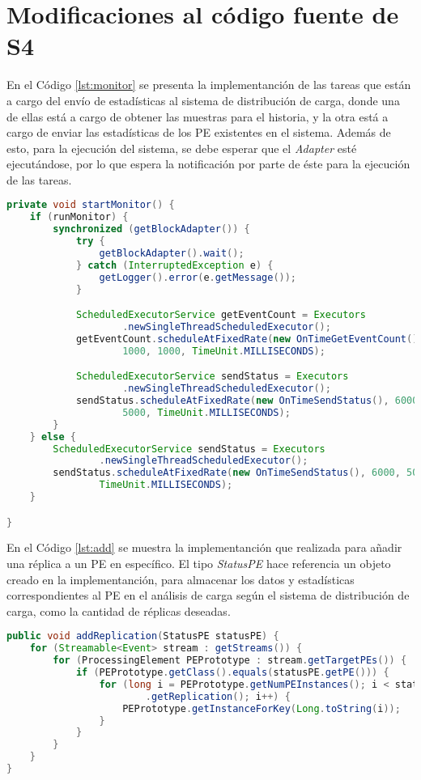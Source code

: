 \chapter{Modificaciones al c\'odigo fuente de S4}
\label{apendice:codigoFuenteS4}

En el C\'odigo \ref{lst:monitor} se presenta la implementanci\'on de las tareas que est\'an a cargo del env\'io de estad\'isticas al sistema de distribuci\'on de carga, donde una de ellas est\'a a cargo de obtener las muestras para el historia, y la otra est\'a a cargo de enviar las estad\'isticas de los PE existentes en el sistema. Adem\'as de esto, para la ejecuci\'on del sistema, se debe esperar que el \textit{Adapter} est\'e ejecut\'andose, por lo que espera la notificaci\'on por parte de \'este para la ejecuci\'on de las tareas.

\begin{lstlisting}[caption={Tareas que ejecutan el sistema de distribuci\'on de carga.},label={lst:monitor},language=Java]
private void startMonitor() {
	if (runMonitor) {
		synchronized (getBlockAdapter()) {
			try {
				getBlockAdapter().wait();
			} catch (InterruptedException e) {
				getLogger().error(e.getMessage());
			}

			ScheduledExecutorService getEventCount = Executors
					.newSingleThreadScheduledExecutor();
			getEventCount.scheduleAtFixedRate(new OnTimeGetEventCount(),
					1000, 1000, TimeUnit.MILLISECONDS);

			ScheduledExecutorService sendStatus = Executors
					.newSingleThreadScheduledExecutor();
			sendStatus.scheduleAtFixedRate(new OnTimeSendStatus(), 6000,
					5000, TimeUnit.MILLISECONDS);
		}
	} else {
		ScheduledExecutorService sendStatus = Executors
				.newSingleThreadScheduledExecutor();
		sendStatus.scheduleAtFixedRate(new OnTimeSendStatus(), 6000, 5000,
				TimeUnit.MILLISECONDS);
	}

}
\end{lstlisting}

En el C\'odigo \ref{lst:add} se muestra la implementanci\'on que realizada para a\~nadir una r\'eplica a un PE en espec\'ifico. El tipo \textit{StatusPE} hace referencia un objeto creado en la implementanci\'on, para almacenar los datos y estad\'isticas correspondientes al PE en el an\'alisis de carga seg\'un el sistema de distribuci\'on de carga, como la cantidad de r\'eplicas deseadas.

\begin{lstlisting}[caption={A\~nadir r\'eplicas a un PE en S4.},label={lst:add},language=Java]
public void addReplication(StatusPE statusPE) {
	for (Streamable<Event> stream : getStreams()) {
		for (ProcessingElement PEPrototype : stream.getTargetPEs()) {
			if (PEPrototype.getClass().equals(statusPE.getPE())) {
				for (long i = PEPrototype.getNumPEInstances(); i < statusPE
						.getReplication(); i++) {
					PEPrototype.getInstanceForKey(Long.toString(i));
				}
			}
		}
	}
}
\end{lstlisting}

